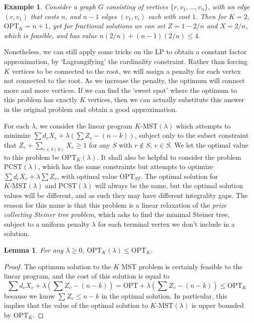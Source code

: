 \documentclass{article}
\theoremstyle{plain}
\newtheorem{lemma}{Lemma}
\newtheorem*{example}{Example}
\begin{document}
\begin{example}
    Consider a graph $G$ consisting of vertices $\{ r, v_1, \dots, v_n \}$, with an edge $(r,v_1)$ that costs $n$, and $n-1$ edges $(v_1,v_i)$ each with cost $1$. Then for $K = 2$, $\text{OPT}_K = n+1$, yet for fractional solutions we can set $Z = 1 - 2/n$ and $X = 2/n$, which is feasible, and has value $n(2/n) + (n-1)(2/n) \leq 4$.
\end{example}

Nonetheless, we can still apply some tricks on the LP to obtain a constant factor approximation, by `Lagrangifying' the cardinality constraint. Rather than forcing $K$ vertices to be connected to the root, we will assign a penalty for each vertex not connected to the root. As we increase the penalty, the optimum will connect more and more vertices. If we can find the `sweet spot' where the optimum to this problem has exactly $K$ vertices, then we can actually substitute this answer in the original problem and obtain a good approximation.

For each $\lambda$, we consider the linear program $K\text{-MST}(\lambda)$ which attempts to minimize $\sum d_eX_e + \lambda (\sum Z_v - (n-k))$, subject only to the subset constraint that $Z_v + \sum_{e \in \delta(S)} X_e \geq 1$ for any $S$ with $r \not \in S$, $v \in S$. We let the optimal value to this problem be $\text{OPT}_K(\lambda)$. It shall also be helpful to consider the problem $\text{PCST}(\lambda)$, which has the same constraints but attempts to optimize $\sum d_eX_e + \lambda \sum Z_v$, with optimal value $\text{OPT}_{ST}$. The optimal solution for $K\text{-MST}(\lambda)$ and $\text{PCST}(\lambda)$ will always be the same, but the optimal solution values will be different, and as such they may have different integrality gaps. The reason for this name is that this problem is a linear relaxation of the {\it prize collecting Steiner tree problem}, which asks to find the minimal Steiner tree, subject to a uniform penalty $\lambda$ for each terminal vertex we don't include in a solution.

\begin{lemma}
    For any $\lambda \geq 0$, $\text{OPT}_K(\lambda) \leq \text{OPT}_K$.
\end{lemma}
\begin{proof}
    The optimum solution to the $K$ MST problem is certainly feasible to the linear program, and the cost of this solution is equal to
    \[ \sum d_e X_e + \lambda(\sum Z_v - (n-k)) = \text{OPT} + \lambda(\sum Z_v - (n-k)) \leq \text{OPT}_K \]
    because we know $\sum Z_v \leq n-k$ in the optimal solution. In particular, this implies that the value of the optimal solution to $K\text{-MST}(\lambda)$ is upper bounded by $\text{OPT}_K$.
\end{proof}
\end{document}
